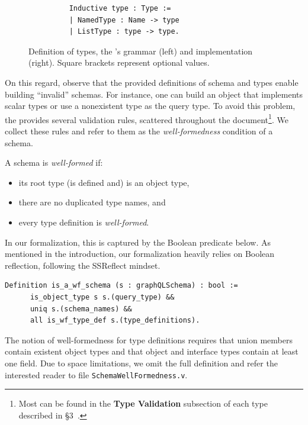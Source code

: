 \begin{figure}[h]
\begin{subfigure}{.5\textwidth}
\begin{verbatim}
    Inductive type : Type :=
    | NamedType : Name -> type
    | ListType : type -> type.
    \end{verbatim}

    \end{subfigure}
    \caption{Definition of \gql types, the \spec's grammar (left) and \coq implementation (right). Square brackets represent optional values. }
    \label{fig:types_def}
\end{figure}




On this regard, observe that the provided definitions of schema and types enable building ``invalid'' schemas. For instance, one can build an object that implements scalar types or use a nonexistent type as the query type. To avoid this problem, the \spec provides several validation rules, scattered throughout the document\footnote{Most can be found in the \textbf{Type Validation} subsection of each type described in \S3~\cite{gqlspec}.}.  We collect these rules and refer to them as the \textit{well-formedness} condition of a \gql schema.


\begin{definition}
A \gql schema is \textit{well-formed} if: 
\begin{itemize}
    \item its root type (is defined and) is an object type, 
    \item there are no duplicated type names, and
    \item every type definition is \textit{well-formed}.
\end{itemize}
\end{definition}

In our \coq formalization, this is captured by the Boolean predicate below. As mentioned in the introduction, our formalization heavily relies on Boolean reflection, following the SSReflect mindset.
%
\begin{verbatim}
Definition is_a_wf_schema (s : graphQLSchema) : bool :=
      is_object_type s s.(query_type) &&
      uniq s.(schema_names) &&
      all is_wf_type_def s.(type_definitions).
\end{verbatim}
%
The notion of well-formedness for type definitions requires \eg that union members contain existent object types and that object and interface types contain at least one field. Due to space limitations, we omit the full definition and refer the interested reader to file \texttt{SchemaWellFormedness.v}.

